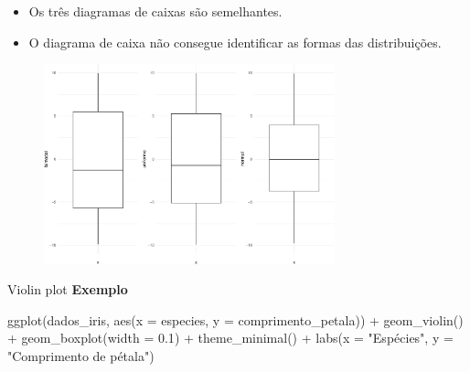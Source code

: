 \documentclass[
  10pt,
  ignorenonframetext,
]{beamer}
\newenvironment{Shaded}{\begin{snugshade}}{\end{snugshade}}
\newcommand{\AttributeTok}[1]{\textcolor[rgb]{0.40,0.45,0.13}{#1}}
\newcommand{\FloatTok}[1]{\textcolor[rgb]{0.68,0.00,0.00}{#1}}
\newcommand{\FunctionTok}[1]{\textcolor[rgb]{0.28,0.35,0.67}{#1}}
\newcommand{\NormalTok}[1]{\textcolor[rgb]{0.00,0.23,0.31}{#1}}
\newcommand{\SpecialCharTok}[1]{\textcolor[rgb]{0.37,0.37,0.37}{#1}}
\newcommand{\StringTok}[1]{\textcolor[rgb]{0.13,0.47,0.30}{#1}}
\providecommand{\tightlist}{%
  \setlength{\itemsep}{0pt}\setlength{\parskip}{0pt}}\usepackage{longtable,booktabs,array}
\begin{document}
\begin{frame}
\begin{itemize}
\tightlist
\item
  Os três diagramas de caixas são semelhantes.
\item
  O diagrama de caixa não consegue identificar as formas das
  distribuições.
\end{itemize}

\begin{figure}

{\centering \includegraphics[width=0.75\textwidth,height=\textheight]{exploracao-visualizacao_files/figure-beamer/unnamed-chunk-89-1.pdf}

}

\end{figure}
\end{frame}

\begin{frame}[fragile]{Violin plot}
\protect\hypertarget{violin-plot-3}{}
\textbf{Exemplo}

\begin{Shaded}
\begin{Highlighting}[]
\FunctionTok{ggplot}\NormalTok{(dados\_iris, }\FunctionTok{aes}\NormalTok{(}\AttributeTok{x =}\NormalTok{ especies, }\AttributeTok{y =}\NormalTok{ comprimento\_petala)) }\SpecialCharTok{+}
  \FunctionTok{geom\_violin}\NormalTok{() }\SpecialCharTok{+} 
  \FunctionTok{geom\_boxplot}\NormalTok{(}\AttributeTok{width =} \FloatTok{0.1}\NormalTok{) }\SpecialCharTok{+}
  \FunctionTok{theme\_minimal}\NormalTok{() }\SpecialCharTok{+}
  \FunctionTok{labs}\NormalTok{(}\AttributeTok{x =} \StringTok{"Espécies"}\NormalTok{, }\AttributeTok{y =} \StringTok{"Comprimento de pétala"}\NormalTok{)}
\end{Highlighting}
\end{Shaded}
\end{frame}
\end{document}
